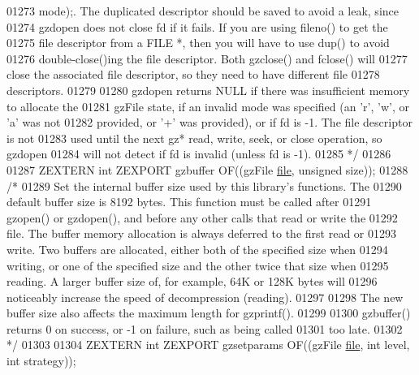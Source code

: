 \begin{DoxyCode}
01273 \textcolor{comment}{   mode);.  The duplicated descriptor should be saved to avoid a leak, since}
01274 \textcolor{comment}{   gzdopen does not close fd if it fails.  If you are using fileno() to get the}
01275 \textcolor{comment}{   file descriptor from a FILE *, then you will have to use dup() to avoid}
01276 \textcolor{comment}{   double-close()ing the file descriptor.  Both gzclose() and fclose() will}
01277 \textcolor{comment}{   close the associated file descriptor, so they need to have different file}
01278 \textcolor{comment}{   descriptors.}
01279 \textcolor{comment}{}
01280 \textcolor{comment}{     gzdopen returns NULL if there was insufficient memory to allocate the}
01281 \textcolor{comment}{   gzFile state, if an invalid mode was specified (an 'r', 'w', or 'a' was not}
01282 \textcolor{comment}{   provided, or '+' was provided), or if fd is -1.  The file descriptor is not}
01283 \textcolor{comment}{   used until the next gz* read, write, seek, or close operation, so gzdopen}
01284 \textcolor{comment}{   will not detect if fd is invalid (unless fd is -1).}
01285 \textcolor{comment}{*/}
01286 
01287 ZEXTERN \textcolor{keywordtype}{int} ZEXPORT gzbuffer OF((gzFile \hyperlink{structfile}{file}, \textcolor{keywordtype}{unsigned} size));
01288 \textcolor{comment}{/*}
01289 \textcolor{comment}{     Set the internal buffer size used by this library's functions.  The}
01290 \textcolor{comment}{   default buffer size is 8192 bytes.  This function must be called after}
01291 \textcolor{comment}{   gzopen() or gzdopen(), and before any other calls that read or write the}
01292 \textcolor{comment}{   file.  The buffer memory allocation is always deferred to the first read or}
01293 \textcolor{comment}{   write.  Two buffers are allocated, either both of the specified size when}
01294 \textcolor{comment}{   writing, or one of the specified size and the other twice that size when}
01295 \textcolor{comment}{   reading.  A larger buffer size of, for example, 64K or 128K bytes will}
01296 \textcolor{comment}{   noticeably increase the speed of decompression (reading).}
01297 \textcolor{comment}{}
01298 \textcolor{comment}{     The new buffer size also affects the maximum length for gzprintf().}
01299 \textcolor{comment}{}
01300 \textcolor{comment}{     gzbuffer() returns 0 on success, or -1 on failure, such as being called}
01301 \textcolor{comment}{   too late.}
01302 \textcolor{comment}{*/}
01303 
01304 ZEXTERN \textcolor{keywordtype}{int} ZEXPORT gzsetparams OF((gzFile \hyperlink{structfile}{file}, \textcolor{keywordtype}{int} level, \textcolor{keywordtype}{int} strategy));

\end{DoxyCode}
